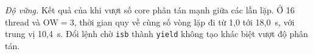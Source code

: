 \emph{Độ vững.} Kết quả của  khi vượt số core phân tán mạnh giữa các lần lặp. Ở
16 thread và $\mathrm{OW} = 3$, thời gian quy về cùng số vòng lặp đi từ 1,0 tới 18,0~s, với trung vị
10,4~s. Đổi lệnh chờ \texttt{isb} thành \texttt{yield} không tạo
khác biệt vượt độ phân tán.

